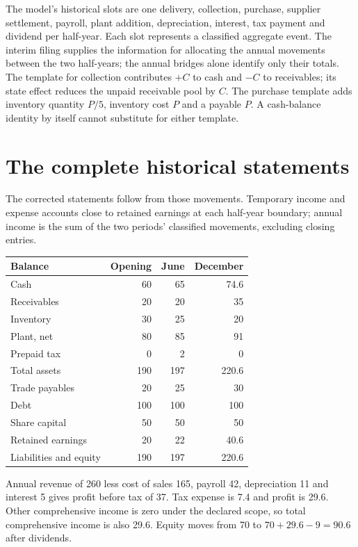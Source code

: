 The model's historical slots are one delivery, collection, purchase, supplier
settlement, payroll, plant addition, depreciation, interest, tax payment and
dividend per half-year. Each slot represents a classified aggregate event.
The interim filing supplies the information for allocating the annual movements
between the two half-years; the annual bridges alone identify only their totals.
The template for collection contributes $+C$ to cash and $-C$ to receivables;
its state effect reduces the unpaid receivable pool by $C$. The purchase
template adds inventory quantity $P/5$, inventory cost $P$ and a payable $P$.
A cash-balance identity by itself cannot substitute for either template.

\section{The complete historical statements}

The corrected statements follow from those movements. Temporary income and
expense accounts close to retained earnings at each half-year boundary;
annual income is the sum of the two periods' classified movements, excluding
closing entries.

\begin{center}
\begin{tabular}{lrrr}
\toprule Balance & Opening & June & December\\\midrule
Cash &60&65&74.6\\
Receivables &20&20&35\\
Inventory &30&25&20\\
Plant, net &80&85&91\\
Prepaid tax &0&2&0\\
Total assets &190&197&220.6\\\midrule
Trade payables &20&25&30\\
Debt &100&100&100\\
Share capital &50&50&50\\
Retained earnings &20&22&40.6\\
Liabilities and equity &190&197&220.6\\\bottomrule
\end{tabular}
\end{center}

Annual revenue of 260 less cost of sales 165, payroll 42, depreciation 11 and
interest 5 gives profit before tax of 37. Tax expense is 7.4 and profit is 29.6.
Other comprehensive income is zero under the declared scope, so total
comprehensive income is also 29.6. Equity moves from 70 to
$70+29.6-9=90.6$ after dividends.

